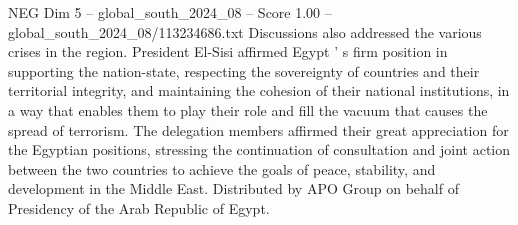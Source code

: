 \begin{textsample}{NEG Dim 5 – global\_south\_2024\_08 – Score 1.00 – global\_south\_2024\_08/113234686.txt}
Discussions also addressed the various crises in the region.
President El-Sisi affirmed Egypt ' s firm position in supporting the nation-state, respecting the sovereignty of countries and their territorial integrity, and maintaining the cohesion of their national institutions, in a way that enables them to play their role and fill the vacuum that causes the spread of terrorism.
The delegation members affirmed their great appreciation for the Egyptian positions, stressing the continuation of consultation and joint action between the two countries to achieve the goals of peace, stability, and development in the Middle East.
Distributed by APO Group on behalf of Presidency of the Arab Republic of Egypt.

\end{textsample}
